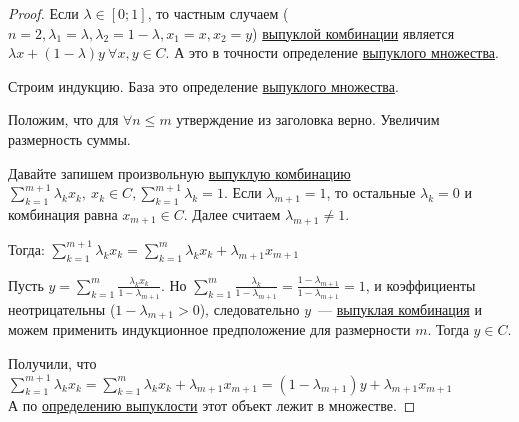 

\begin{proof}
  Если $\lambda \in [0;1]$, то частным случаем ($n=2, \lambda_1=\lambda, \lambda_2 = 1-\lambda, x_1=x, x_2 = y$) \hyperref[note:8583F986-A6E8-4BBB-B2FB-BA0E9BBE58BF]{выпуклой комбинации} является $\lambda x + (1-\lambda)y\ \forall x, y \in C$.
  А это в точности определение \hyperref[note:316B5BFA-8B9F-4267-9086-D6593AAB5F9B]{выпуклого множества}.

  Строим индукцию.
  База это определение \hyperref[note:316B5BFA-8B9F-4267-9086-D6593AAB5F9B]{выпуклого множества}.

  Положим, что для $\forall n \le m$ утверждение  из заголовка верно.
  Увеличим размерность суммы.

  Давайте запишем произвольную \hyperref[note:8583F986-A6E8-4BBB-B2FB-BA0E9BBE58BF]{выпуклую комбинацию}
  $\sum\limits_{k=1}^{m+1} \lambda_k x_k,\ x_k \in C, \sum\limits_{k=1}^{m+1} \lambda_k = 1$. Если $\lambda_{m+1} = 1$, то остальные $\lambda_k = 0$ и комбинация равна $x_{m+1} \in C$. Далее считаем $\lambda_{m+1} \ne 1$.

  Тогда:
  $\sum\limits_{k=1}^{m+1} \lambda_k x_k = \sum\limits_{k=1}^{m} \lambda_k x_k + \lambda_{m+1}x_{m+1}$

  Пусть $y = \sum\limits_{k=1}^m \frac{\lambda_k x_k}{1 - \lambda_{m+1}}$. Но $\sum\limits_{k=1}^m \frac{\lambda_k}{1-\lambda_{m+1}} = \frac{1-\lambda_{m+1}}{1-\lambda_{m+1}} = 1$, и коэффициенты неотрицательны ($1 - \lambda_{m+1} > 0$), следовательно $y$~--- \hyperref[note:8583F986-A6E8-4BBB-B2FB-BA0E9BBE58BF]{выпуклая комбинация} и можем применить индукционное предположение для размерности $m$.
  Тогда $y \in C$.

  Получили, что $\sum\limits_{k=1}^{m+1} \lambda_k x_k = \sum\limits_{k=1}^{m} \lambda_k x_k + \lambda_{m+1}x_{m+1} = (1-\lambda_{m+1})y + \lambda_{m+1}x_{m+1}$ \\
  А по \hyperref[note:316B5BFA-8B9F-4267-9086-D6593AAB5F9B]{определению выпуклости} этот объект лежит в множестве.
\end{proof}
